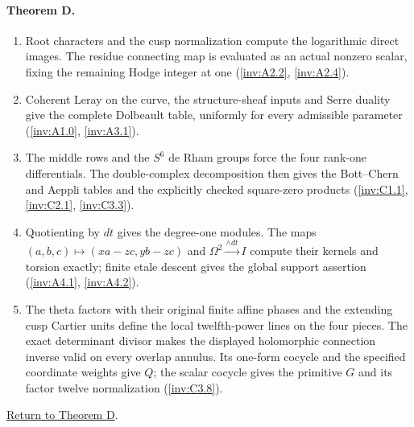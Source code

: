 \paragraph{Theorem D.}
\begin{enumerate}[label=\arabic*.]
\item\hypertarget{step-I-D-1}{} Root characters and the cusp
normalization compute the logarithmic direct images.  The residue
connecting map is evaluated as an actual nonzero scalar, fixing
the remaining Hodge integer at one
(\hyperref[inv:A2.2]{\ref*{inv:A2.2}},
\hyperref[inv:A2.4]{\ref*{inv:A2.4}}).
\item\hypertarget{step-I-D-2}{} Coherent Leray on the curve,
the structure-sheaf inputs and Serre duality give the complete
Dolbeault table, uniformly for every admissible parameter
(\hyperref[inv:A1.0]{\ref*{inv:A1.0}},
\hyperref[inv:A3.1]{\ref*{inv:A3.1}}).
\item\hypertarget{step-I-D-3}{} The middle rows and the
$S^6$ de Rham groups force the four rank-one differentials.
The double-complex decomposition then gives the Bott--Chern and
Aeppli tables and the explicitly checked square-zero products
(\hyperref[inv:C1.1]{\ref*{inv:C1.1}},
\hyperref[inv:C2.1]{\ref*{inv:C2.1}},
\hyperref[inv:C3.3]{\ref*{inv:C3.3}}).
\item\hypertarget{step-I-D-4}{} Quotienting by $dt$ gives the
degree-one modules.  The maps $(a,b,c)\mapsto(xa-zc,yb-zc)$
and $\Omega^2\xrightarrow{\wedge dt}I$ compute their kernels
and torsion exactly; finite etale descent gives the global
support assertion
(\hyperref[inv:A4.1]{\ref*{inv:A4.1}},
\hyperref[inv:A4.2]{\ref*{inv:A4.2}}).
\item\hypertarget{step-I-D-5}{} The theta factors with their original
finite affine phases and the extending cusp Cartier units define the
local twelfth-power lines on the four pieces.  The exact determinant divisor makes
the displayed holomorphic connection inverse valid on every overlap
annulus.  Its one-form cocycle and the specified coordinate weights
give $Q$; the scalar cocycle gives the primitive $G$ and its factor
twelve normalization
(\hyperref[inv:C3.8]{\ref*{inv:C3.8}}).
\end{enumerate}
\hyperlink{main-I-D}{Return to Theorem D}.

\hypertarget{outline-I-E}{}
